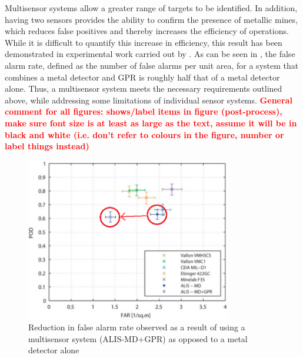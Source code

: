 \documentclass[main.tex]{subfiles}
\begin{document}
Multisensor systems allow a greater range of targets to be identified. In addition, having two sensors provides the ability to confirm the presence of metallic mines, which reduces false positives and thereby increases the efficiency of operations. While it is difficult to quantify this increase in efficiency, this result has been demonstrated in experimental work carried out by \textcite{Takahashi10}. As can be seen in , the false alarm rate, defined as the number of false alarms per unit area, for a system that combines a metal detector and GPR is roughly half that of a metal detector alone. Thus, a multisensor system meets the necessary requirements outlined above, while addressing some limitations of individual sensor systems. \textcolor{red}{\textbf{General comment for all figures: shows/label items in figure (post-process), make sure font size is at least as large as the text, assume it will be in black and white (i.e. don't refer to colours in the figure, number or label things instead)}}

\begin{figure}[ht]
\includegraphics[width=0.8\textwidth]{3-ConceptDesign/FAR2.png}
\centering
\caption[Reduction in false alarm rate as a result of using a multisensor system]{Reduction in false alarm rate observed as a result of using a multisensor system (ALIS-MD+GPR) as opposed to a metal detector alone \parencite{Takahashi10}} 
\end{figure}
\end{document}
